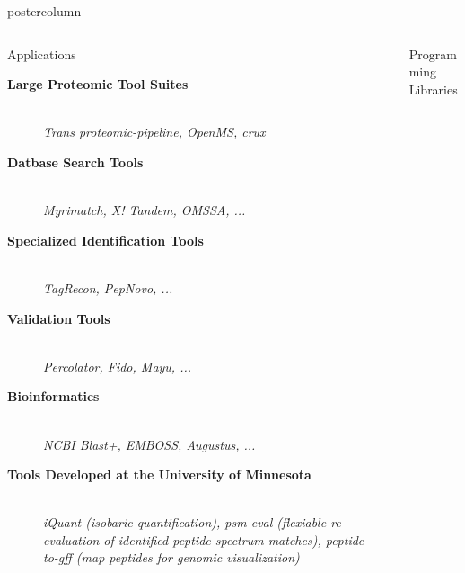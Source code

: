 \documentclass[final]{beamer}
\begin{document}
\begin{frame}
\begin{columns}
\begin{column}{.5\textwidth}
\begin{beamercolorbox}[center,wd=\textwidth]{postercolumn}
\begin{minipage}[T]{.95\textwidth}
{\begin{columns}
\begin{column}{.49\textwidth}
            \begin{block}{Applications}
              \begin{description}
                 \item[\textbf{Large Proteomic Tool Suites}] \hfill \\
                  \textsl{Trans proteomic-pipeline, OpenMS, crux}
                \item[\textbf{Datbase Search Tools}] \hfill \\
                  \textsl{Myrimatch, X! Tandem, OMSSA, ...}
                \item[\textbf{Specialized Identification Tools}] \hfill \\
                  \textsl{TagRecon, PepNovo, ...}
                \item[\textbf{Validation Tools}] \hfill \\
                  \textsl{Percolator, Fido, Mayu, ...}
                \item[\textbf{Bioinformatics}] \hfill \\
                  \textsl{NCBI Blast+, EMBOSS, Augustus, ...}
                \item[\textbf{Tools Developed at the University of Minnesota}]  \hfill \\
                  \textsl{iQuant (isobaric quantification), psm-eval (flexiable re-evaluation of identified peptide-spectrum matches), peptide-to-gff (map peptides for genomic visualization)}
              \end{description}
            \end{block}
              \end{column}
              \begin{column}{.02\textwidth}
              \end{column}
              \begin{column}{.49\textwidth}
            \begin{block}{Programming Libraries}


\end{block}
\end{column}
\end{columns}}
\end{minipage}
\end{beamercolorbox}
\end{column}
\end{columns}
\end{frame}
\end{document}
